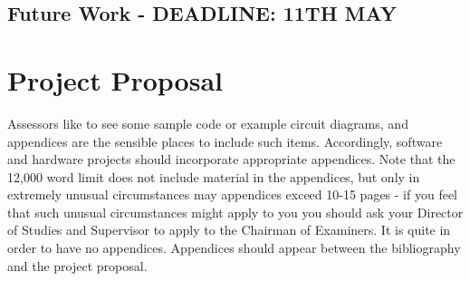 \documentclass[12pt,a4paper,twoside,openright]{report}
\begin{document}
\section{Future Work - DEADLINE: 11TH MAY}

\appendix

\chapter{Project Proposal}
\label{sec:proposal}
Assessors like to see some sample code or example circuit diagrams, and appendices are the sensible places to include such items. Accordingly, software and hardware projects should incorporate appropriate appendices. Note that the 12,000 word limit does not include material in the appendices, but only in extremely unusual circumstances may appendices exceed 10-15 pages - if you feel that such unusual circumstances might apply to you you should ask your Director of Studies and Supervisor to apply to the Chairman of Examiners. It is quite in order to have no appendices. Appendices should appear between the bibliography and the project proposal.

\end{document}

